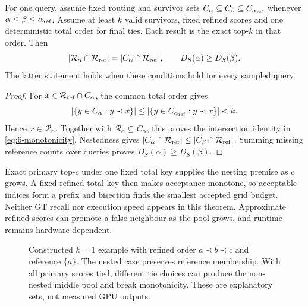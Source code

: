 \par\noindent\begin{minipage}{\linewidth}
\begin{proposition}
\label{prop:6-monotonicity}
For one query, assume fixed routing and survivor sets
$C_\alpha\subseteq C_\beta\subseteq C_{\alpha_{\rm ref}}$ whenever
$\alpha\leq\beta\leq\alpha_{\rm ref}$. Assume at least $k$ valid
survivors, fixed refined scores and one deterministic total order for
final ties. Each result is the exact top-$k$ in that order. Then
\begin{equation}
 |\mathcal R_\alpha\cap\mathcal R_{\rm ref}|
 =|C_\alpha\cap\mathcal R_{\rm ref}|,
 \qquad D_S(\alpha)\geq D_S(\beta).
 \label{eq:6-monotonicity}
\end{equation}
The latter statement holds when these conditions hold for every sampled
query.
\end{proposition}
\begin{proof}
For $x\in\mathcal R_{\rm ref}\cap C_\alpha$, the common total order gives
\begin{equation*}
 |\{y\in C_\alpha:y\prec x\}|
 \leq|\{y\in C_{\alpha_{\rm ref}}:y\prec x\}|<k.
\end{equation*}
Hence $x\in\mathcal R_\alpha$. Together with
$\mathcal R_\alpha\subseteq C_\alpha$, this proves the intersection
identity in \cref{eq:6-monotonicity}. Nestedness gives
$|C_\alpha\cap\mathcal R_{\rm ref}|
 \leq|C_\beta\cap\mathcal R_{\rm ref}|$.
Summing missing reference counts over queries proves
$D_S(\alpha)\geq D_S(\beta)$.
\end{proof}
\end{minipage}\par\medskip

Exact primary top-$c$ under one fixed total key supplies the nesting
premise as $c$ grows. A fixed refined total key then makes acceptance
monotone, so acceptable indices form a prefix and bisection finds the
smallest accepted grid budget. Neither GT recall nor execution speed
appears in this theorem. Approximate refined scores can promote a false
neighbour as the pool grows, and runtime remains hardware dependent.

\begin{figure}[tbp]
\centering

\caption[Nested and non-nested candidate pools]{Constructed $k=1$ example with refined order $a\prec b\prec c$
and reference $\{a\}$. The nested case preserves reference membership.
With all primary scores tied, different tie choices can produce the
non-nested middle pool and break monotonicity. These are explanatory
sets, not measured GPU outputs.}
\label{fig:6-nesting}
\end{figure}

